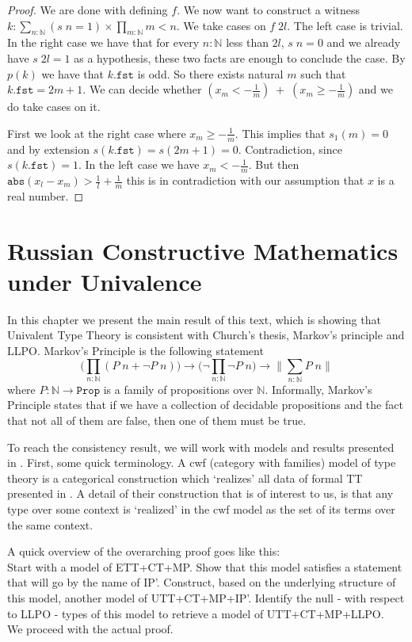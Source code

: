 \documentclass[12pt]{report}
\theoremstyle{definition}
\begin{document}
\begin{proof}
We are done with defining $f$. 
We now want to construct a witness $k : \sum_{n : \mathbb{N}}(s\;n = 1)\times \prod_{m : \mathbb{N}}m < n$. 
We take cases on $f\; 2l$. 
The left case is trivial. 
In the right case we have that for every $n :\mathbb{N}$ less than $2l$, $s\;n = 0$ and we already have $s\;2l = 1$ as a hypothesis, these two facts are enough to conclude the case. 
By $p(k)$ we have that $k.\mathtt{fst}$ is odd. 
So there exists natural $m$ such that $k.\mathtt{fst} = 2m+1$. 
We can decide whether $(x_m < -\frac{1}{m})\;+\;(x_m \geq -\frac{1}{m})$ and we do take cases on it. 

First we look at the right case where $x_m \geq -\frac{1}{m}$. 
This implies that $s_1(m) = 0$ and by extension $s(k.\mathtt{fst}) = s(2m+1) = 0$. 
Contradiction, since $s(k.\mathtt{fst}) = 1$. 
In the left case we have $x_m < -\frac{1}{m}$. 
But then $\mathtt{abs}(x_l-x_m) > \frac{1}{l} + \frac{1}{m}$ this is in contradiction with our assumption that $x$ is a real number. 
\end{proof}

\chapter{Russian Constructive Mathematics under Univalence}\label{RUSS}
In this chapter we present the main result of this text, which is showing that Univalent Type Theory is consistent with Church's thesis, Markov's principle and LLPO. 
Markov's Principle is the following statement
$$\Big(\prod_{n : \mathbb{N}}(P\; n + \neg P\; n)\Big) \rightarrow  \Big(\neg \prod_{n : \mathbb{N}}\neg P\; n\Big)\rightarrow \Big\lVert \sum_{n : \mathbb{N}} P\; n \Big\rVert$$
where $P : \mathbb{N} \rightarrow \mathtt{Prop}$ is a family of propositions over $\mathbb{N}$. 
Informally, Markov's Principle states that if we have a collection of decidable propositions and the fact that not all of them are false, then one of them must be true. 

To reach the consistency result, we will work with models and results presented in \cite{1905.03014}. 
First, some quick terminology. 
A cwf (category with families) model of type theory is a categorical construction which `realizes' all data of formal TT presented in . 
A detail of their construction that is of interest to us, is that any type over some context is `realized' in the cwf model as the set of its terms over the same context. 

A quick overview of the overarching proof goes like this:\\
Start with a model of ETT+CT+MP. 
Show that this model satisfies a statement that will go by the name of IP'. 
Construct, based on the underlying structure of this model, another model of UTT+CT+MP+IP'. 
Identify the null - with respect to LLPO - types of this model to retrieve a model of UTT+CT+MP+LLPO.\\
We proceed with the actual proof. 
\end{document}
